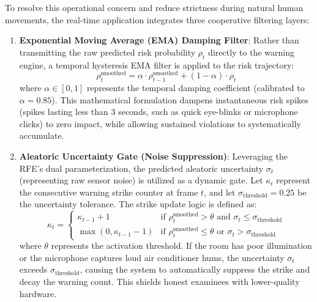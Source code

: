 \documentclass[journal]{IEEEtran}
\begin{document}
To resolve this operational concern and reduce strictness during natural human movements, the real-time application integrates three cooperative filtering layers:
\begin{enumerate}
    \item \textbf{Exponential Moving Average (EMA) Damping Filter}: Rather than transmitting the raw predicted risk probability $\rho_t$ directly to the warning engine, a temporal hysteresis EMA filter is applied to the risk trajectory:
    \begin{equation}
        \rho_t^{\mathrm{smoothed}} = \alpha \cdot \rho_{t-1}^{\mathrm{smoothed}} + (1 - \alpha) \cdot \rho_t
    \end{equation}
    where $\alpha \in [0, 1]$ represents the temporal damping coefficient (calibrated to $\alpha = 0.85$). This mathematical formulation dampens instantaneous risk spikes (spikes lasting less than $3$ seconds, such as quick eye-blinks or microphone clicks) to zero impact, while allowing sustained violations to systematically accumulate.

    \item \textbf{Aleatoric Uncertainty Gate (Noise Suppression)}: Leveraging the RFE's dual parameterization, the predicted aleatoric uncertainty $\sigma_t$ (representing raw sensor noise) is utilized as a dynamic gate. Let $\kappa_t$ represent the consecutive warning strike counter at frame $t$, and let $\sigma_{\mathrm{threshold}} = 0.25$ be the uncertainty tolerance. The strike update logic is defined as:
    \begin{equation}
        \kappa_t = \begin{cases}
            \kappa_{t-1} + 1 & \text{if } \rho_t^{\mathrm{smoothed}} > \theta \text{ and } \sigma_t \le \sigma_{\mathrm{threshold}} \\
            \max(0, \kappa_{t-1} - 1) & \text{if } \rho_t^{\mathrm{smoothed}} \le \theta \text{ or } \sigma_t > \sigma_{\mathrm{threshold}}
        \end{cases}
    \end{equation}
    where $\theta$ represents the activation threshold. If the room has poor illumination or the microphone captures loud air conditioner hums, the uncertainty $\sigma_t$ exceeds $\sigma_{\mathrm{threshold}}$, causing the system to automatically suppress the strike and decay the warning count. This shields honest examinees with lower-quality hardware.


\end{enumerate}
\end{document}
